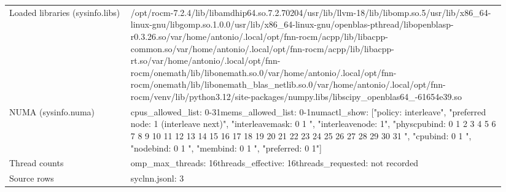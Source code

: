 \begin{longtable}{>{\raggedright\arraybackslash}p{0.23\linewidth}>{\raggedright\arraybackslash}p{0.71\linewidth}}
Loaded libraries (sysinfo.libs) & /\allowbreak{}opt/\allowbreak{}rocm-7.2.4/\allowbreak{}lib/\allowbreak{}libamdhip64.so.7.2.70204\newline /\allowbreak{}usr/\allowbreak{}lib/\allowbreak{}llvm-18/\allowbreak{}lib/\allowbreak{}libomp.so.5\newline /\allowbreak{}usr/\allowbreak{}lib/\allowbreak{}x86\_\allowbreak{}64-linux-gnu/\allowbreak{}libgomp.so.1.0.0\newline /\allowbreak{}usr/\allowbreak{}lib/\allowbreak{}x86\_\allowbreak{}64-linux-gnu/\allowbreak{}openblas-pthread/\allowbreak{}libopenblasp-r0.3.26.so\newline /\allowbreak{}var/\allowbreak{}home/\allowbreak{}antonio/\allowbreak{}.local/\allowbreak{}opt/\allowbreak{}fnn-rocm/\allowbreak{}acpp/\allowbreak{}lib/\allowbreak{}libacpp-common.so\newline /\allowbreak{}var/\allowbreak{}home/\allowbreak{}antonio/\allowbreak{}.local/\allowbreak{}opt/\allowbreak{}fnn-rocm/\allowbreak{}acpp/\allowbreak{}lib/\allowbreak{}libacpp-rt.so\newline /\allowbreak{}var/\allowbreak{}home/\allowbreak{}antonio/\allowbreak{}.local/\allowbreak{}opt/\allowbreak{}fnn-rocm/\allowbreak{}onemath/\allowbreak{}lib/\allowbreak{}libonemath.so.0\newline /\allowbreak{}var/\allowbreak{}home/\allowbreak{}antonio/\allowbreak{}.local/\allowbreak{}opt/\allowbreak{}fnn-rocm/\allowbreak{}onemath/\allowbreak{}lib/\allowbreak{}libonemath\_\allowbreak{}blas\_\allowbreak{}netlib.so.0\newline /\allowbreak{}var/\allowbreak{}home/\allowbreak{}antonio/\allowbreak{}.local/\allowbreak{}opt/\allowbreak{}fnn-rocm/\allowbreak{}venv/\allowbreak{}lib/\allowbreak{}python3.12/\allowbreak{}site-packages/\allowbreak{}numpy.libs/\allowbreak{}libscipy\_\allowbreak{}openblas64\_\allowbreak{}-61654e39.so \\
NUMA (sysinfo.numa) & cpus\_\allowbreak{}allowed\_\allowbreak{}list: 0-31\newline mems\_\allowbreak{}allowed\_\allowbreak{}list: 0-1\newline numactl\_\allowbreak{}show: ["policy: interleave", "preferred node: 1 (interleave next)", "interleavemask: 0 1 ", "interleavenode: 1", "physcpubind: 0 1 2 3 4 5 6 7 8 9 10 11 12 13 14 15 16 17 18 19 20 21 22 23 24 25 26 27 28 29 30 31 ", "cpubind: 0 1 ", "nodebind: 0 1 ", "membind: 0 1 ", "preferred: 0 1"] \\
Thread counts & omp\_\allowbreak{}max\_\allowbreak{}threads: 16\newline threads\_\allowbreak{}effective: 16\newline threads\_\allowbreak{}requested: not recorded \\
Source rows & syclnn.jsonl: 3 \\
\end{longtable}
